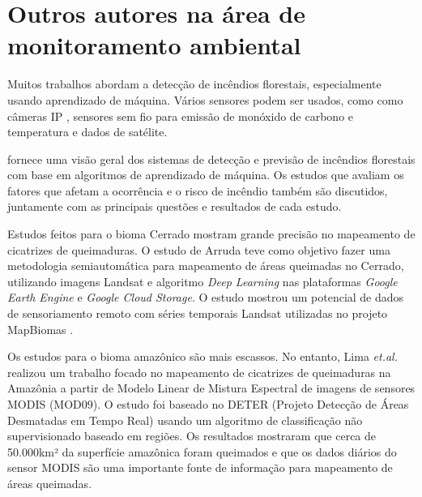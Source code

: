 


\section{Outros autores na área de monitoramento ambiental}


Muitos trabalhos abordam a detecção de incêndios florestais, especialmente usando aprendizado de máquina. Vários sensores podem ser usados, como
como câmeras IP \cite{forest-fire-ip-camera}, sensores sem fio para emissão de monóxido de carbono e temperatura \cite{forest-fire-detection-wireless-sensor} e dados de satélite.

\cite{Abid2021} fornece uma visão geral dos sistemas de detecção e previsão de incêndios florestais com base em algoritmos de aprendizado de máquina.
Os estudos que avaliam os fatores que afetam a ocorrência e o risco de incêndio também são discutidos, juntamente com as principais questões e resultados de cada estudo.

Estudos feitos para o bioma Cerrado mostram grande precisão no mapeamento de cicatrizes de queimaduras. O estudo de Arruda \cite{queimadas_cerrado}  teve como objetivo fazer uma metodologia semiautomática para mapeamento de áreas queimadas no Cerrado, utilizando imagens Landsat e algoritmo \textit{Deep Learning} nas plataformas \textit{Google Earth Engine} e \textit{Google Cloud Storage}. O estudo mostrou um potencial de dados de sensoriamento remoto com séries temporais Landsat utilizadas no projeto MapBiomas \cite{MapBiomasQueimadas}.





Os estudos para o bioma amazônico são mais escassos. No entanto, Lima \textit{et.al.} \cite{ModisGiovanna} realizou um trabalho focado no mapeamento de cicatrizes de queimaduras na Amazônia a partir de Modelo Linear de Mistura Espectral de imagens de sensores MODIS (MOD09). O estudo foi baseado no DETER (Projeto Detecção de Áreas Desmatadas em Tempo Real) \cite{deter} usando um algoritmo de classificação não supervisionado baseado em regiões. Os resultados mostraram que cerca de 50.000km² da superfície amazônica foram queimados e que os dados diários do sensor MODIS são uma importante fonte de informação para mapeamento de áreas queimadas.

